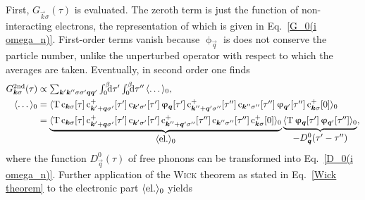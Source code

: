 First, $G_{\vec k \sigma}(\tau)$ is evaluated. The zeroth term is just the
 function of non-interacting electrons, the 
representation of which is given in Eq.~\ref{G_0(i omega_n)}. First-order terms
vanish because $\upphi_{\vec q}$ is does not conserve the particle number,
unlike the unperturbed  operator with respect to which the
averages are taken. Eventually, in second order one finds
%
\begin{align} \label{Holstein 2nd}
    G \super{2nd}_{\vec k \sigma}(\tau) &\propto
    \sum_{\vec k' \vec k'' \sigma \sigma' \vec q \vec q'}
    \int \from 0 \till \beta \D \tau' \int \from 0 \till \beta \D \tau'' \,
    \av \dots_0,
    \\ \notag
    \av \dots_0 &= \av{\op T \,
        \op c_{\vec k \sigma}[\tau] \,
        \op c_{\vec k' + \vec q \sigma'}^+[\tau'] \,
        \op c_{\vec k' \sigma'}[\tau'] \,
        \upphi_{\vec q}[\tau'] \,
        \op c_{\vec k'' + \vec q' \sigma''}^+[\tau''] \,
        \op c_{\vec k'' \sigma''}[\tau''] \,
        \upphi_{\vec q'}[\tau''] \,
        \op c_{\vec k \sigma}^+[0]}_0
    \\ \notag
    &= \underbrace{
            \av{\op T \,
                \op c_{\vec k \sigma}[\tau] \,
                \op c_{\vec k' + \vec q \sigma'}^+[\tau'] \,
                \op c_{\vec k' \sigma'}[\tau'] \,
                \op c_{\vec k'' + \vec q' \sigma''}^+[\tau''] \,
                \op c_{\vec k'' \sigma''}[\tau''] \,
                \op c_{\vec k \sigma}^+[0]}_0
            }_{\displaystyle \av{\text{el.}}_0}
        \underbrace{
            \av{\op T \,
                \upphi_{\vec q}[\tau'] \,
                \upphi_{\vec q'}[\tau'']}_0
            }_{\displaystyle -D^0_{\vec q}(\tau' - \tau'')},
\end{align}
%
where the  function $D^0_{\vec q}(\tau)$ of free phonons can be
transformed into Eq.~\ref{D_0(i omega_n)}. Further application of the
\textsc{Wick} theorem as stated in Eq.~\ref{Wick theorem} to the electronic part
$\langle\text{el.}\rangle_0$ yields
%
\begingroup
    \def\minalignsep{0pt}
